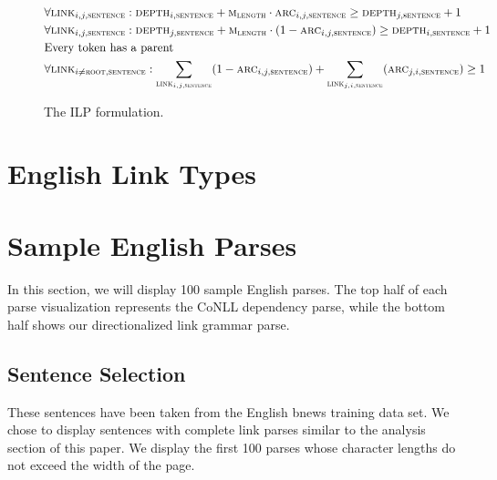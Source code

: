 \documentclass[11pt]{article}
\begin{document}
\begin{figure}
\begin{align*}
    &\forall{\textsc{link}_{i,j,\textsc{sentence}}}: \textsc{depth}_{i,\textsc{sentence}} + \textsc{m}_\textsc{length}\cdot\textsc{arc}_{i,j,\textsc{sentence}} \geq \textsc{depth}_{j,\textsc{sentence}} + 1 &\\
    &\forall{\textsc{link}_{i,j,\textsc{sentence}}}: \textsc{depth}_{j,\textsc{sentence}} + \textsc{m}_\textsc{length}\cdot(1-\textsc{arc}_{i,j,\textsc{sentence}}) \geq \textsc{depth}_{i,\textsc{sentence}} + 1 &\\
    &\text{Every token has a parent}&\\
    &\forall{\textsc{link}_{i \neq \textsc{root},\textsc{sentence}}}: \sum_{\textsc{link}_{i,j,\textsc{sentence}}} (1-\textsc{arc}_{i,j,\textsc{sentence}}) + \sum_{\textsc{link}_{j,i,\textsc{sentence}}}(\textsc{arc}_{j,i,\textsc{sentence}}) \geq 1&\\
  \end{align*}
  \caption{\small The ILP formulation.}
\end{figure}



\section{English Link Types}


\section{Sample English Parses}
In this section, we will display 100 sample English parses. The top half of each parse visualization represents the CoNLL dependency parse, while the bottom half shows our directionalized link grammar parse. 

\subsection{Sentence Selection}
These sentences have been taken from the English bnews training data set. We chose to display sentences with complete link parses similar to the analysis section of this paper. We display the first 100 parses whose character lengths do not exceed the width of the page.
\end{document}
